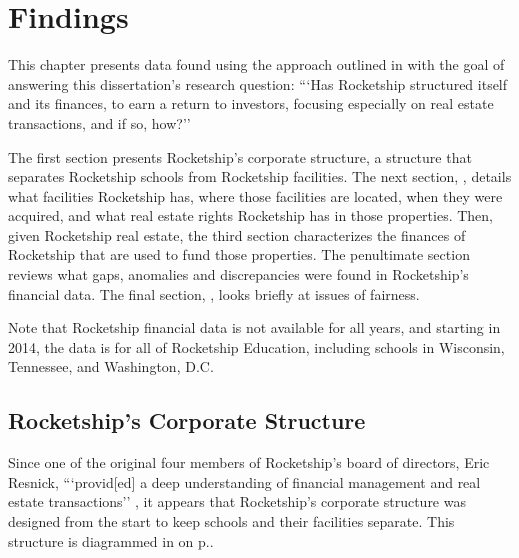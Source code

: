 
\chapter{Findings}\label{ch:findings}

This chapter presents data found using the approach outlined in  with the goal of answering this dissertation's research question: ```Has Rocketship structured itself and its finances, to earn a return to investors, focusing especially on real estate transactions, and if so, how?''

The first section presents Rocketship's corporate structure, a structure that separates Rocketship schools from Rocketship facilities. The next section, , details what facilities Rocketship has, where those facilities are located, when they were acquired, and what real estate rights Rocketship has in those properties. Then, given Rocketship real estate, the third section characterizes the finances of Rocketship that are used to fund those properties. The penultimate section reviews what gaps, anomalies and discrepancies were found in Rocketship's financial data. The final section, , looks briefly at issues of fairness.

Note that Rocketship financial data is not available for all years, and starting in 2014, the data is for all of Rocketship Education, including schools in Wisconsin, Tennessee, and Washington, D.C.

\section{Rocketship's Corporate Structure}\indent%
\label{sec:RSED-corporate-structure}

Since one of the original four members of Rocketship's board of directors, Eric Resnick, ```provid[ed] a deep
understanding of financial management and real estate transactions'' \parencite{Danner2006}%
, it appears that Rocketship's corporate structure was designed from the start to keep schools and their facilities separate. This structure is diagrammed in  on p.\pageref{fig:corporate-structure}.

